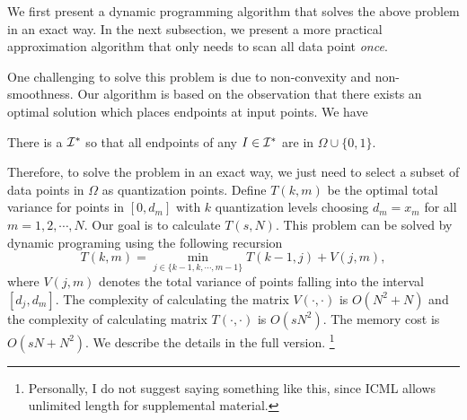 We first present a dynamic programming algorithm that solves the above problem in an exact way. In the next subsection, we present a more practical approximation algorithm that only needs to scan all data point \emph{once}.

One challenging to solve this problem is due to non-convexity and non-smoothness. Our algorithm is based on the observation that
there exists an optimal solution which places endpoints at input points. We have

\begin{lemma}
\label{lem:discrete}
There is a $\setI^*$ so that all endpoints of any $I \in \mathcal{I}^*$ are in $\Omega \cup \{0, 1\}$.
\end{lemma}


\iffalse
\begin{proof}
Fix any endpoint $b$ of intervals in $\setI^*$. WLOG assume that $b \neq 0, 1$. Then we must have $I = [a, b]$ and $I' = [b, c]$ for some $I, I' \in \setI^*$. Observe that the choice of $b$ only affects the error for points in $I \cup I'$. We have that $\err (\Omega, I) + \err (\Omega, I') $ is given by 
\begin{align*}
& \sum_{x \in I} (b - x) (x - a) + \sum_{x \in I'} (c -x)(x - b) \\
&= A b + C \; ,
\end{align*}
where $A, C$ are constants which do not depend on $b$. Hence, this is a linear objective in $b$. Since $b$ can freely range between the rightmost point in $I$ and the leftmost point in $I'$, there is an optimizer for this solution at one of those two points. Hence we may choose $b \in \Omega$.
\end{proof}
\fi

Therefore, to solve the problem in an exact way, we just need to select a subset of data points in $\Omega$ as quantization points. Define $T(k, m)$ be the optimal total variance for points in $[0, d_m]$ with $k$ quantization levels choosing $d_m=x_m$ for all $m=1,2,\cdots, N$. Our goal is to calculate $T(s, N)$. This problem can be solved by dynamic programing using the following recursion
\[
T(k, m) = \min_{j\in \{k-1, k, \cdots, m-1\}} T(k-1,j) + V(j,m),
\]
where $V(j,m)$ denotes the total variance of points falling into the interval $[d_j, d_m]$. The complexity of calculating the matrix $V(\cdot, \cdot)$ is $O(N^2 + N)$ and the complexity of calculating matrix $T(\cdot, \cdot)$ is $O(sN^2)$. The  memory cost is $O(sN + N^2)$. 
We describe the details in the full version. \footnote{Personally, I do not suggest saying something like this, since ICML allows unlimited length for supplemental material.}

